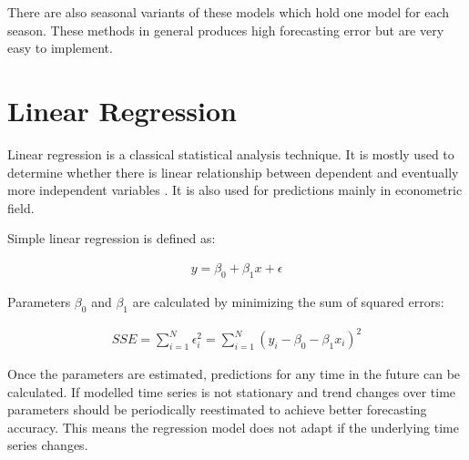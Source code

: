     There are also seasonal variants of these models which hold one model for each season. These methods in general
    produces high forecasting error but are very easy to implement.

    \section{Linear Regression} \label{sec:linear-regression}
    Linear regression is a classical statistical analysis technique. It is mostly used to determine whether there is
    linear relationship between dependent and eventually more independent variables \cite{cipra}. It is also used for
    predictions mainly in econometric field.

    Simple linear regression is defined as:

    \begin{eqnarray} \label{eq:linear-regression}
        y = \beta_0 + \beta_1 x + \epsilon
    \end{eqnarray}

    Parameters $\beta_0$ and $\beta_1$ are calculated by minimizing the sum of squared errors:
    
    \begin{eqnarray} \label{eq:linear-regression-estimation}
        SSE = \sum_{i=1}^N \epsilon_{i}^2 = \sum_{i=1}^N (y_i - \beta_0 - \beta_1 x_i)^2
    \end{eqnarray}
    
    Once the parameters are estimated, predictions for any time in the future can be calculated. If modelled time
    series is not stationary and trend changes over time parameters should be periodically reestimated to achieve
    better forecasting accuracy. This means the regression model does not adapt if the underlying time series changes.


